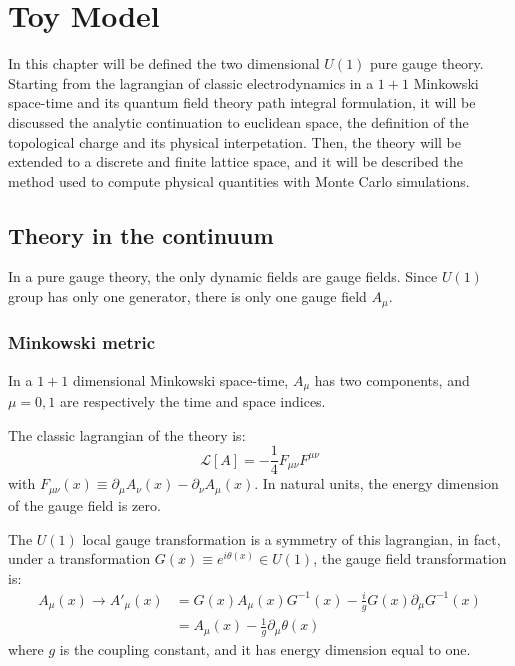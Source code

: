 \chapter{Toy Model}\label{ch:toy_model}

In this chapter will be defined the two dimensional $U(1)$ pure gauge theory.
Starting from the lagrangian of classic electrodynamics in a $1+1$ Minkowski space-time and its quantum field theory path integral formulation,
it will be discussed the analytic continuation to euclidean space, the definition of the topological charge and its physical interpetation.
Then, the theory will be extended to a discrete and finite lattice space, and it will be described the method used to compute physical quantities with Monte Carlo simulations.

\section{Theory in the continuum}

In a pure gauge theory, the only dynamic fields are gauge fields.
Since $U(1)$ group has only one generator, there is only one gauge field $A_\mu$.

\subsection*{Minkowski metric}

In a $1+1$ dimensional Minkowski space-time, $A_\mu$ has two components, and $\mu = 0, 1$ are respectively the time and space indices.

The classic lagrangian of the theory is:
\[
    \mathcal L[A] = -\frac{1}{4} F_{\mu\nu}F^{\mu\nu}
\]
with $F_{\mu\nu}(x) \equiv \partial_\mu A_\nu(x) - \partial_\nu A_\mu(x)$.
In natural units, the energy dimension of the gauge field is zero.

The $U(1)$ local gauge transformation is a symmetry of this lagrangian, in fact,
under a transformation $G(x) \equiv e^{i\theta(x)} \in U(1)$,
the gauge field transformation is:
\begin{align*}
    A_\mu(x) \rightarrow A'_\mu(x) &= G(x) A_\mu(x) G^{-1}(x) - \frac{i}{g} G(x) \partial_\mu G^{-1}(x) \\
                                   &= A_\mu(x) - \frac{1}{g} \partial_\mu \theta(x)
\end{align*}
where $g$ is the coupling constant, and it has energy dimension equal to one.

